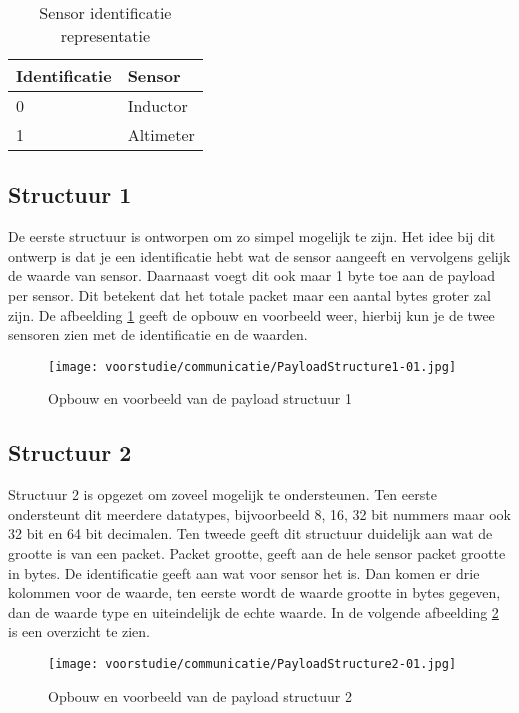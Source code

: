\begin{table}[h!]
	\centering
	\caption{Sensor identificatie representatie}
	\label{tab:SensorRep}
	\begin{tabular}{p{4cm}p{6cm}}
	\toprule
	Identificatie & Sensor        \\ \midrule
	0      & Inductor  \\
	1      & Altimeter \\ \bottomrule
	\end{tabular}%
\end{table}

\subsection{Structuur 1}
De eerste structuur is ontworpen om zo simpel mogelijk te zijn. Het idee bij dit ontwerp is dat je een identificatie hebt wat de sensor aangeeft en vervolgens gelijk de waarde van sensor. Daarnaast voegt dit ook maar 1 byte toe aan de payload per sensor. Dit betekent dat het totale packet maar een aantal bytes groter zal zijn. De afbeelding \ref{fig:Structure1} geeft de opbouw en voorbeeld weer, hierbij kun je de twee sensoren zien met de identificatie en de waarden.
\begin{figure}[h!]
	\centering
	\label{fig:Structure1}

	\caption{Opbouw en voorbeeld van de payload structuur 1}
	\texttt{[image: voorstudie/communicatie/PayloadStructure1-01.jpg]}
\end{figure}

\newpage
\subsection{Structuur 2}
Structuur 2 is opgezet om zoveel mogelijk te ondersteunen. Ten eerste ondersteunt dit meerdere datatypes, bijvoorbeeld 8, 16, 32 bit nummers maar ook 32 bit en 64 bit decimalen. Ten tweede geeft dit structuur duidelijk aan wat de grootte is van een packet. Packet grootte, geeft aan de hele sensor packet grootte in bytes. De identificatie geeft aan wat voor sensor het is. Dan komen er drie kolommen voor de waarde, ten eerste wordt de waarde grootte in bytes gegeven, dan de waarde type en uiteindelijk de echte waarde. In de volgende afbeelding \ref{fig:Structure2} is een overzicht te zien.
\begin{figure}[h!]
	\centering
	\label{fig:Structure2}
	\caption{Opbouw en voorbeeld van de payload structuur 2}
	\texttt{[image: voorstudie/communicatie/PayloadStructure2-01.jpg]}
\end{figure}

